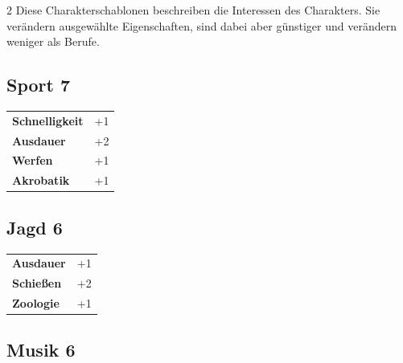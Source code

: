 \begin{multicols}{2}
Diese Charakterschablonen beschreiben die Interessen des Charakters. Sie verändern ausgewählte Eigenschaften, sind dabei aber günstiger und verändern weniger als Berufe.

\begin{tcolorbox}
    \subsection*{Sport \hfill \small{7 }}
    \tcblower




\begin{tabular}{@{}ll@{}}
    \textbf{Schnelligkeit} & +1\\
    \textbf{Ausdauer} & +2\\
    \textbf{Werfen} & +1\\
    \textbf{Akrobatik} & +1\\
\end{tabular}


\end{tcolorbox}

\begin{tcolorbox}
    \subsection*{Jagd \hfill \small{6 }}
    \tcblower




\begin{tabular}{@{}ll@{}}
    \textbf{Ausdauer} & +1\\
    \textbf{Schießen} & +2\\
    \textbf{Zoologie} & +1\\
\end{tabular}


\end{tcolorbox}

\begin{tcolorbox}
    \subsection*{Musik \hfill \small{6 }}
    \tcblower





\end{tcolorbox}
\end{multicols}
